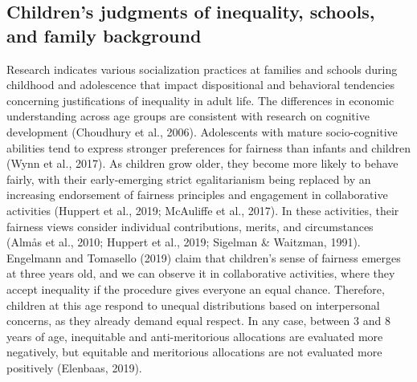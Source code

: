 \documentclass[
  letterpaper,
  DIV=11,
  numbers=noendperiod]{scrartcl}
\begin{document}
\subsection{Children's judgments of inequality, schools, and family
background}\label{childrens-judgments-of-inequality-schools-and-family-background}

Research indicates various socialization practices at families and
schools during childhood and adolescence that impact dispositional and
behavioral tendencies concerning justifications of inequality in adult
life. The differences in economic understanding across age groups are
consistent with research on cognitive development (Choudhury et al.,
2006). Adolescents with mature socio-cognitive abilities tend to express
stronger preferences for fairness than infants and children (Wynn et
al., 2017). As children grow older, they become more likely to behave
fairly, with their early-emerging strict egalitarianism being replaced
by an increasing endorsement of fairness principles and engagement in
collaborative activities (Huppert et al., 2019; McAuliffe et al., 2017).
In these activities, their fairness views consider individual
contributions, merits, and circumstances (Almås et al., 2010; Huppert et
al., 2019; Sigelman \& Waitzman, 1991). Engelmann and Tomasello (2019)
claim that children's sense of fairness emerges at three years old, and
we can observe it in collaborative activities, where they accept
inequality if the procedure gives everyone an equal chance. Therefore,
children at this age respond to unequal distributions based on
interpersonal concerns, as they already demand equal respect. In any
case, between 3 and 8 years of age, inequitable and anti-meritorious
allocations are evaluated more negatively, but equitable and meritorious
allocations are not evaluated more positively (Elenbaas, 2019).
\end{document}
